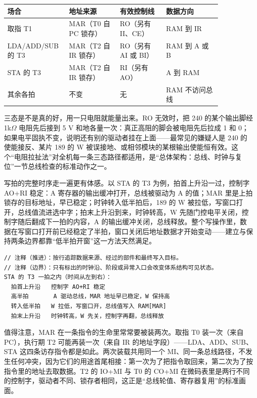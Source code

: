 \begin{longtable}{L{0.20\linewidth}L{0.22\linewidth}L{0.20\linewidth}L{0.24\linewidth}}
\toprule
场合 & 地址来源 & 有效控制线 & 数据方向 \\
\midrule
取指 T1 & MAR（T0 自 PC 锁存） & RO（另有 II、CE） & RAM 到 IR \\\tablerowrule
LDA/ADD/SUB 的 T3 & MAR（T2 自 IR 锁存） & RO（另有 AI 或 BI） & RAM 到 A 或 B \\\tablerowrule
STA 的 T3 & MAR（T2 自 IR 锁存） & RI（另有 AO） & A 到 RAM \\\tablerowrule
其余各拍 & 不变 & 无 & RAM 不访问总线 \\
\bottomrule
\end{longtable}

三态是不是真的好，用一只电阻就能量出来。RO 无效时，把 240 的某个输出脚经 1k$\Omega$ 电阻先后接到 5 V 和地各量一次：真正高阻的脚会被电阻先后拉成 1 和 0；如果电平固执不变，说明还有别的驱动者挂在上面——最常见的嫌疑人是 240 的使能接反、某片 189 的 W 被误接地、或相邻模块的某根输出使能恒有效。这个“电阻拉扯法”对全机每一条三态路径都适用，是“总体架构：总线、时钟与复位”一节总线检查的标准动作之一。

写拍的完整时序走一遍更有体感。以 STA 的 T3 为例，拍首上升沿一过，控制字 AO+RI 稳定：A 寄存器的输出缓冲打开，总线被驱动为 A 的值；MAR 里是上拍锁存的目标地址，早已稳定；时钟转入低半拍后，189 的 W 被拉低，写窗口打开，总线值流进选中字；拍末上升沿到来，时钟转高，W 先随门控电平关闭，控制字随后翻成下一拍的内容，A 的输出缓冲关闭，总线释放。整个写操作里，数据在写窗口打开前已经稳定了半拍，窗口关闭后地址数据才开始变动——建立与保持两条边界都靠“低半拍开窗”这一方法天然满足。

\begin{lstlisting}
// 注释（推进）：按行追踪数据来源、经过的部件和最终写入目标。
// 注释（边界）：只有标出的时钟沿、阶段或异常入口会改变体系结构可见状态。
STA 的 T3 一拍之内（时间从左到右）：
  拍首上升沿   控制字 AO+RI 稳定
  高半拍       A 驱动总线，MAR 地址早已稳定，W 保持高
  转入低半拍   W 拉低，写窗口开，总线值写入 RAM[MAR]
  拍末上升沿   时钟转高，W 先关，控制字再翻，总线释放
\end{lstlisting}

值得注意，MAR 在一条指令的生命里常常要被装两次。取指 T0 装一次（来自 PC），执行期 T2 可能再装一次（来自 IR 的地址字段）——LDA、ADD、SUB、STA 这四条访存指令都是如此。两次装载共用同一个 MI、同一条总线路径，不发生任何冲突，因为它们的用途首尾相接：第一次为了把指令取回来，第二次为了按指令里的地址去取数据。T2 的 IO+MI 与 T0 的 CO+MI 在微码表里是两行不同的控制字，驱动者不同、锁存者相同，这正是“总线轮值、寄存器复用”的标准画面。

